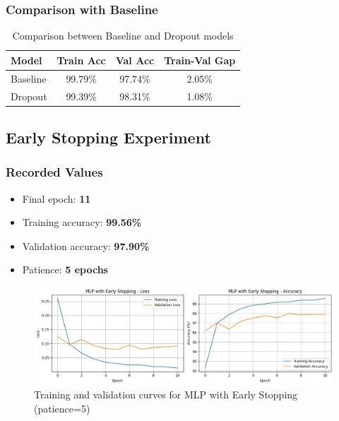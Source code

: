 \subsubsection{Comparison with Baseline}
\begin{table}[h]
\centering
\begin{tabular}{|l|c|c|c|}
\hline
\textbf{Model} & \textbf{Train Acc} & \textbf{Val Acc} & \textbf{Train-Val Gap} \\ \hline
Baseline       & 99.79\%            & 97.74\%          & 2.05\%                 \\ \hline
Dropout        & 99.39\%            & 98.31\%          & 1.08\%                 \\ \hline
\end{tabular}
\caption{Comparison between Baseline and Dropout models}
\label{tab:dropout-comparison}
\end{table}

\subsection{Early Stopping Experiment}

\subsubsection{Recorded Values}
\begin{itemize}
    \item Final epoch: \textbf{11}
    \item Training accuracy: \textbf{99.56\%}
    \item Validation accuracy: \textbf{97.90\%}
    \item Patience: \textbf{5 epochs}
\end{itemize}

\begin{figure}[h]
    \centering
    \includegraphics[width=0.8\linewidth]{section2/early_stopping.png}
    \caption{Training and validation curves for MLP with Early Stopping (patience=5)}
    \label{fig:early-stopping}
\end{figure}

